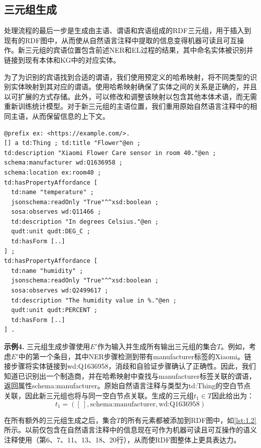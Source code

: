 \documentclass[supercite]{Experimental_Report}
\newcommand{\rlst}[1]{\autoref{lst:#1}}
\theoremstyle{definition}
\begin{document}
\subsection{三元组生成}

处理流程的最后一步是生成由主语、谓语和宾语组成的RDF三元组，用于插入到现有的RDF图中，从而使从自然语言注释中提取的信息变得机器可读且可互操作。新三元组的宾语位置包含前述NER和EL过程的结果，其中命名实体被识别并链接到现有本体和KG中的对应实体。

为了为识别的宾语找到合适的谓语，我们使用预定义的哈希映射，将不同类型的识别实体映射到其对应的谓语。使用哈希映射确保了实体之间的关系是正确的，并且以可扩展的方式存储。此外，可以修改和调整该映射以包含其他本体术语，而无需重新训练统计模型。对于新三元组的主语位置，我们重用原始自然语言注释中的相同主语，从而保留信息的上下文。

\begin{lstlisting}[language={}, caption={描述传感器的RDF图，其中包含基于嵌入自然语言注释生成的额外三元组。}, label={lst:1.2}]
@prefix ex: <https://example.com/>.
[] a td:Thing ; td:title "Flower"@en ;
td:description "Xiaomi Flower Care sensor in room 40."@en ;
schema:manufacturer wd:Q1636958 ;
schema:location ex:room40 ;
td:hasPropertyAffordance [
  td:name "temperature" ;
  jsonschema:readOnly "True"^^xsd:boolean ;
  sosa:observes wd:Q11466 ;
  td:description "In degrees Celsius."@en ;
  qudt:unit qudt:DEG_C ;
  td:hasForm [..]
] ;
td:hasPropertyAffordance [
  td:name "humidity" ;
  jsonschema:readOnly "True"^^xsd:boolean ;
  sosa:observes wd:Q2499617 ;
  td:description "The humidity value in %."@en ;
  qudt:unit qudt:PERCENT ;
  td:hasForm [..]
] .
\end{lstlisting}

\textbf{示例4.} 三元组生成步骤使用$E'$作为输入并生成所有输出三元组的集合$T$。例如，考虑$E'$中的第一个条目，其中NER步骤检测到带有manufacturer标签的Xiaomi。链接步骤将实体链接到wd:Q1636958，消歧和自验证步骤确认了正确性。因此，我们知道已识别出一个制造商，并在哈希映射中查找与manufacturer标签关联的谓语，返回属性schema:manufacturer。原始自然语言注释与类型为td:Thing的空白节点关联，因此新三元组也将与同一空白节点关联。生成的三元组$t_1 \in T$因此给出为：
\begin{equation}
t_1 = ([\ ], \text{schema:manufacturer}, \text{wd:Q1636958})
\end{equation}

在所有额外的三元组生成之后，集合$T$的所有元素都被添加到RDF图中，如\rlst{1.2}所示。以前仅包含在自然语言注释中的信息现在可作为机器可读且可互操作的语义注释使用（第6、7、11、13、18、20行），从而使RDF图整体上更具表达力。
\end{document}

